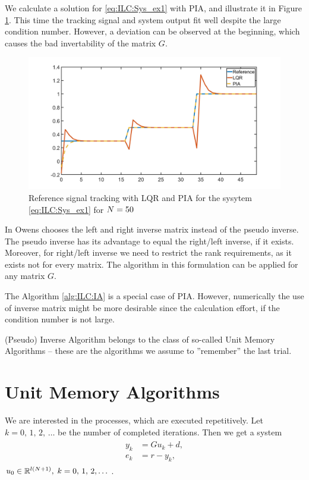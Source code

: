 \begin{exam}
	\label{ex:ILC:PIA}
	We calculate a solution for \eqref{eq:ILC:Sys_ex1} with PIA, and illustrate it in Figure \ref{fig:ILC:Ex1_PIA}. 	
	This time the tracking signal and system output fit well despite the large condition number. However, a deviation can be observed at the beginning, which causes the bad invertability of the matrix $G$. 
	  
	\begin{figure}[ht!]
		\centering
		\includegraphics[width=\textwidth]{fig/Ex1_PIA.jpg}
		\caption{Reference signal tracking with LQR and PIA for the sysytem \eqref{eq:ILC:Sys_ex1} for $N = 50$ }
		\label{fig:ILC:Ex1_PIA}
	\end{figure}
\end{exam}


In \cite{ILC} Owens chooses the left and right inverse matrix instead of the pseudo inverse. 
The pseudo inverse has its advantage to equal the right/left inverse, if it exists. Moreover, for right/left inverse we need to restrict the rank requirements, as it exists not for every matrix. 
The algorithm in this formulation can be applied for any matrix $G$. 

The Algorithm \ref{alg:ILC:IA} is a special case of PIA. However, numerically the use of inverse matrix might be more desirable since the calculation effort, if the condition number is not large. 

(Pseudo) Inverse Algorithm belongs to the class of so-called Unit Memory Algorithms -- these are the algorithms we assume to  ''remember'' the last trial. 

\section{Unit Memory Algorithms}

We are interested in  the processes, which are executed repetitively. Let $k = 0, \, 1, \, 2, \, \dots $ be the number of completed iterations. Then we get a system 
\begin{align}
\label{eq:unitMemory}
\begin{split}
y_{k} &= G u_k + d,  \\ %
e_k &= r - y_k, 
\end{split}
\end{align}
$u_{0} \in {\mathbb{R}}^{l(N+1)},  \; k =0, \,  1, \, 2, \dots $.

